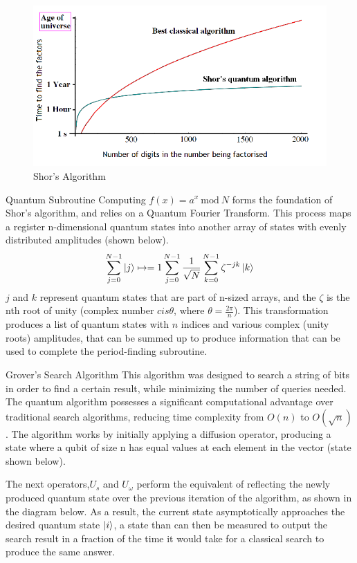 \documentclass[final, 20pt]{beamer}
\newlength{\onecolwid}
\begin{document}
\begin{frame}[t]
\begin{columns}[t]
\begin{column}{\onecolwid}
\begin{figure}
\includegraphics[width=0.9\linewidth]{shor.png}
\caption{Shor's Algorithm}
\end{figure}

\begin{block}{Quantum Subroutine}
Computing $f(x) = a^x \ \text{mod} \ N$ forms the foundation of Shor's algorithm, and relies on a Quantum Fourier Transform. This process maps a register n-dimensional quantum states into another array of  states with evenly distributed amplitudes (shown below). 
\begin{align}
	\sum_{j=0}^{N-1} \ket{j}
	\mapsto = 1
	\sum_{j=0}^{N-1} \frac{1}{\sqrt{N}}
	\sum_{k=0}^{N-1} \zeta^{-jk}\ket{k}
\end{align}
$j$ and $k$ represent quantum states that are part of n-sized arrays, and the $\zeta$ is the nth root of unity (complex number $cis\theta$, where $\theta=\frac{2\pi}{n}$). This transformation produces a list of quantum states with $n$ indices and various complex (unity roots) amplitudes, that can be summed up to produce information that can be used to complete the period-finding subroutine.
\end{block}

\begin{block}{Grover's Search Algorithm}
This algorithm was designed to search a string of bits in order to find a certain result, while minimizing the number of queries needed. The quantum algorithm possesses a significant computational advantage over traditional search algorithms, reducing time complexity from $O(n)$ to $O(\sqrt{n})$. The algorithm works by initially applying a diffusion operator, producing a state where a qubit of size n has equal values at each element in the vector (state shown below).

The next operators,$U_s$ and $U_\omega$ perform the equivalent of reflecting the newly produced quantum state over the previous iteration of the algorithm, as shown in the diagram below. As a result, the current state asymptotically approaches the desired quantum state $\ket{i}$, a state than can then be measured to output the search result in a fraction of the time it would take for a classical search to produce the same answer.


\end{block}
\end{column}
\end{columns}
\end{frame}
\end{document}
